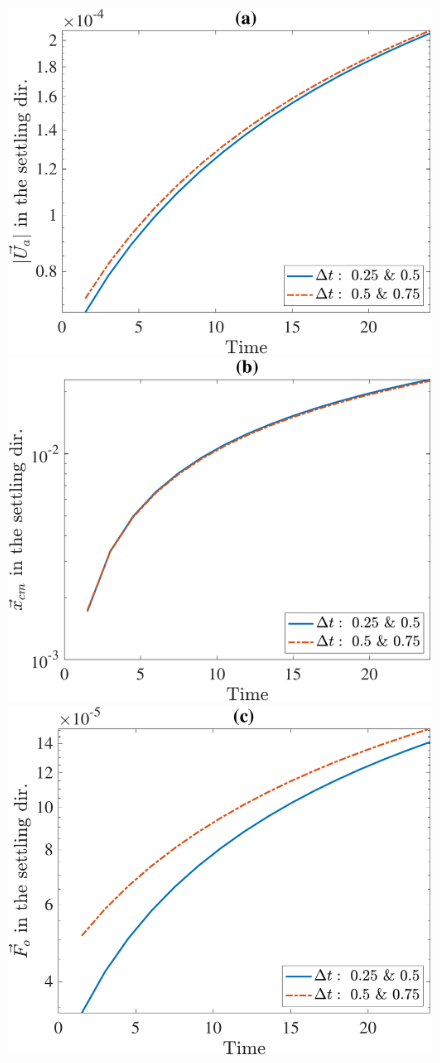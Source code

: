 \begin{figure}[h]
	\begin{center}
		\includegraphics[scale=0.2]{./figures/fig_NC10_dt_diff_Ua3_all}
		\includegraphics[scale=0.2]{./figures/fig_NC10_dt_diff_cm3_all}
		\includegraphics[scale=0.2]{./figures/fig_NC10_dt_diff_Fo3_all}

\end{center}
\end{figure}
